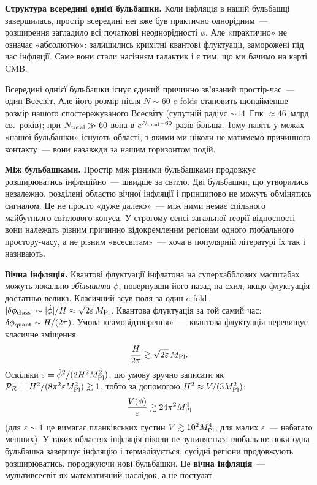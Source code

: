 \textbf{Структура всередині однієї бульбашки.} Коли інфляція
в нашій бульбашці завершилась, простір всередині неї вже був
практично однорідним~--- розширення загладило всі початкові
неоднорідності $\phi$. Але «практично» не означає «абсолютно»:
залишились крихітні квантові флуктуації, заморожені під час
інфляції. Саме вони стали насінням галактик і є тим, що ми
бачимо на карті CMB.

Всередині однієї бульбашки існує єдиний причинно зв'язаний
простір-час~--- один Всесвіт. Але його розмір після $N \sim 60$
$e$-folds становить щонайменше розмір нашого спостережуваного Всесвіту
(супутній радіус $\sim 14$~Гпк $\approx 46$~млрд св.\ років); при $N_{\rm total}\gg 60$
вона в $e^{N_{\rm total}-60}$ разів більша. Тому навіть у
межах «нашої бульбашки» існують області, з якими ми ніколи
не матимемо причинного контакту~--- вони назавжди за
нашим горизонтом подій.

\textbf{Між бульбашками.} Простір між різними бульбашками
продовжує розширюватись інфляційно~--- швидше за світло.
Дві бульбашки, що утворились незалежно, розділені областю
вічної інфляції і принципово не можуть обмінятись сигналом.
Це не просто «дуже далеко»~--- між ними немає спільного
майбутнього світлового конуса. У строгому сенсі загальної теорії відносності вони
належать різним причинно відокремленим регіонам
одного глобального простору-часу, а не різним «всесвітам»~---
хоча в популярній літературі їх так і називають.

\textbf{Вічна інфляція.} Квантові флуктуації інфлатона на
суперхабблових масштабах можуть локально \emph{збільшити} $\phi$,
повернувши його назад на схил, якщо флуктуація достатньо велика.
Класичний зсув поля за один $e$-fold: $|\delta\phi_{\rm class}|
\sim |\dot\phi|/H \approx \sqrt{2\varepsilon}\,M_{\rm Pl}$.
Квантова флуктуація за той самий час: $\delta\phi_{\rm quant}
\sim H/(2\pi)$. Умова «самовідтворення»~---
квантова флуктуація перевищує класичне зміщення:
\begin{equation*}
  \frac{H}{2\pi} \gtrsim \sqrt{2\varepsilon}\,M_{\rm Pl}.
\end{equation*}
Оскільки $\varepsilon = \dot\phi^2/(2H^2M_{\rm Pl}^2)$, цю умову зручно записати як
$\mathcal{P}_{\mathcal{R}} = H^2/(8\pi^2\varepsilon M_{\rm Pl}^2) \gtrsim 1$, тобто за допомогою
$H^2 \approx V/(3M_{\rm Pl}^2)$:
\begin{equation*}
  \frac{V(\phi)}{\varepsilon} \gtrsim 24\pi^2 M_{\rm Pl}^4
\end{equation*}
(для $\varepsilon\sim1$ це вимагає планківських густин $V \gtrsim 10^2 M_{\rm Pl}^4$; для малих $\varepsilon$~--- набагато менших).
У таких областях інфляція ніколи не зупиняється глобально:
поки одна бульбашка завершує інфляцію і термалізується,
сусідні регіони продовжують розширюватись, породжуючи нові
бульбашки. Це \textbf{вічна інфляція}~--- мультивсесвіт
як математичний наслідок, а не постулат.

